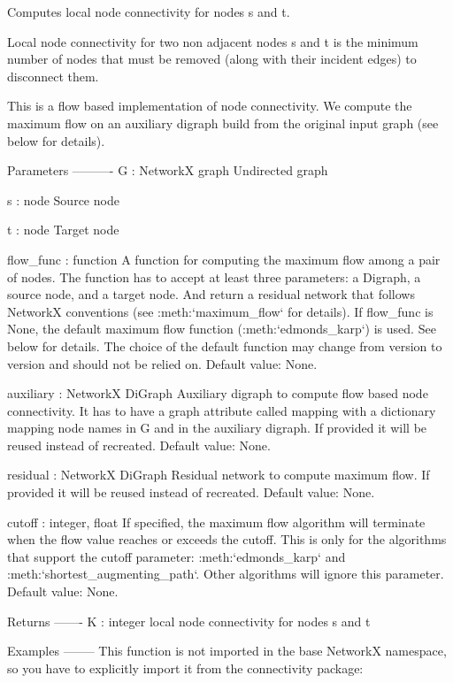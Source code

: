 \begin{DoxyVerb}Computes local node connectivity for nodes s and t.

Local node connectivity for two non adjacent nodes s and t is the
minimum number of nodes that must be removed (along with their incident
edges) to disconnect them.

This is a flow based implementation of node connectivity. We compute the
maximum flow on an auxiliary digraph build from the original input
graph (see below for details).

Parameters
----------
G : NetworkX graph
    Undirected graph

s : node
    Source node

t : node
    Target node

flow_func : function
    A function for computing the maximum flow among a pair of nodes.
    The function has to accept at least three parameters: a Digraph,
    a source node, and a target node. And return a residual network
    that follows NetworkX conventions (see :meth:`maximum_flow` for
    details). If flow_func is None, the default maximum flow function
    (:meth:`edmonds_karp`) is used. See below for details. The choice
    of the default function may change from version to version and
    should not be relied on. Default value: None.

auxiliary : NetworkX DiGraph
    Auxiliary digraph to compute flow based node connectivity. It has
    to have a graph attribute called mapping with a dictionary mapping
    node names in G and in the auxiliary digraph. If provided
    it will be reused instead of recreated. Default value: None.

residual : NetworkX DiGraph
    Residual network to compute maximum flow. If provided it will be
    reused instead of recreated. Default value: None.

cutoff : integer, float
    If specified, the maximum flow algorithm will terminate when the
    flow value reaches or exceeds the cutoff. This is only for the
    algorithms that support the cutoff parameter: :meth:`edmonds_karp`
    and :meth:`shortest_augmenting_path`. Other algorithms will ignore
    this parameter. Default value: None.

Returns
-------
K : integer
    local node connectivity for nodes s and t

Examples
--------
This function is not imported in the base NetworkX namespace, so you
have to explicitly import it from the connectivity package:


\end{DoxyVerb}
